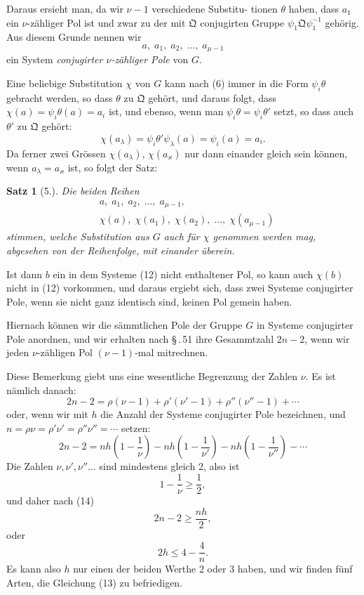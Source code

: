 \documentclass[12pt,a4paper]{article}
\theoremstyle{plain}
\newtheorem{satz}{Satz}[section]
\theoremstyle{definition}
\theoremstyle{remark}
\begin{document}
Daraus ersieht man, da wir $\nu-1$ verschiedene Substitu-
tionen $\theta$ haben, dass $a_1$ ein $\nu$-z\"ahliger Pol ist und zwar zu der
mit $\mathfrak{Q}$ conjugirten Gruppe $\psi_1\mathfrak{Q}\psi_1^{-1}$ geh\"orig. Aus diesem Grunde
nennen wir
\begin{equation}\label{eq:52_12}
a,\; a_1,\; a_2,\; \ldots,\; a_{\mu-1}\tag{12}
\end{equation}
ein System \emph{conjugirter $\nu$-z\"ahliger Pole} von $G$.

Eine beliebige Substitution $\chi$ von $G$ kann nach (6) immer
in die Form $\psi_i\theta$ gebracht werden, so dass $\theta$ zu $\mathfrak{Q}$ geh\"ort, und
daraus folgt, dass $\chi(a) = \psi_i\theta(a) = a_i$ ist, und ebenso, wenn
man $\psi_i\theta = \psi_i\theta'$ setzt, so dass auch $\theta'$ zu $\mathfrak{Q}$ geh\"ort:
\[
\chi(a_\lambda) = \psi_i\theta'\psi_\lambda(a) = \psi_i(a) = a_i.
\]
Da ferner zwei Gr\"ossen $\chi(a_\lambda)$, $\chi(a_\varkappa)$ nur dann einander
gleich sein k\"onnen, wenn $a_\lambda = a_\varkappa$ ist, so folgt der Satz:

\begin{satz}[5.]
Die beiden Reihen
\begin{align*}
& a,\; a_1,\; a_2,\; \ldots,\; a_{\mu-1},\\
& \chi(a),\; \chi(a_1),\; \chi(a_2),\; \ldots,\; \chi(a_{\mu-1})
\end{align*}
stimmen, welche Substitution aus $G$ auch f\"ur $\chi$
genommen werden mag, abgesehen von der
Reihenfolge, mit einander \"uberein.
\end{satz}

Ist dann $b$ ein in dem Systeme (12) nicht enthaltener Pol,
so kann auch $\chi(b)$ nicht in (12) vorkommen, und daraus ergiebt
sich, dass zwei Systeme conjugirter Pole, wenn sie nicht ganz
identisch sind, keinen Pol gemein haben.

Hiernach k\"onnen wir die s\"ammtlichen Pole der Gruppe $G$
in Systeme conjugirter Pole anordnen, und wir erhalten nach
\S\,.\,51 ihre Gesammtzahl $2n-2$, wenn wir jeden $\nu$-z\"ahligen Pol
$(\nu-1)$-mal mitrechnen.

Diese Bemerkung giebt uns eine wesentliche Begrenzung der
Zahlen $\nu$. Es ist n\"amlich danach:
\begin{equation}\label{eq:52_13}
2n - 2 = \rho(\nu-1) + \rho'(\nu'-1) + \rho''(\nu''-1) + \cdots\tag{13}
\end{equation}
oder, wenn wir mit $h$ die Anzahl der Systeme conjugirter Pole
bezeichnen, und $n = \rho\nu = \rho'\nu' = \rho''\nu'' = \cdots$ setzen:
\begin{equation}\label{eq:52_14}
2n - 2 = nh\left(1 - \frac{1}{\nu}\right) - nh\left(1 - \frac{1}{\nu'}\right) - nh\left(1 - \frac{1}{\nu''}\right) - \cdots\tag{14}
\end{equation}
Die Zahlen $\nu, \nu', \nu''\ldots$ sind mindestens gleich 2, also ist
\[
1 - \frac{1}{\nu} \geq \frac{1}{2},
\]
und daher nach (14)
\[
2n - 2 \geq \frac{nh}{2},
\]
oder
\[
2h \leq 4 - \frac{4}{n}.
\]
Es kann also $h$ nur einen der beiden Werthe 2 oder 3 haben,
und wir finden f\"unf Arten, die Gleichung (13) zu befriedigen.
\end{document}

